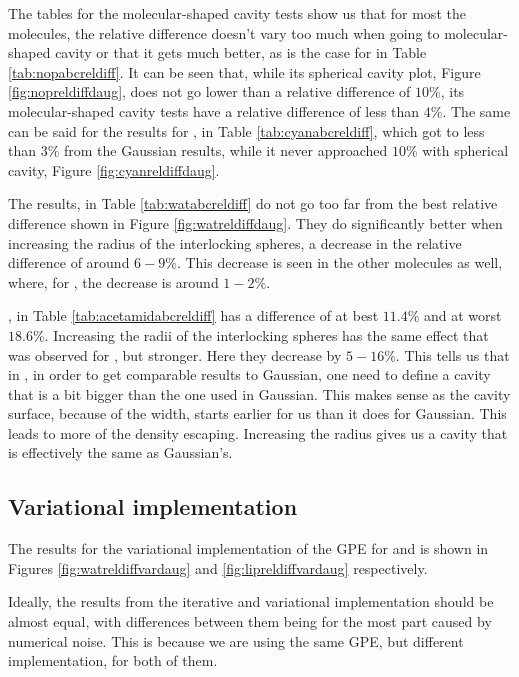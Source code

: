 \documentclass[../master_thesis.tex]{subfiles}
\begin{document}
The tables for the molecular-shaped cavity tests  show us that for most the molecules, the
relative difference doesn't vary too much when going to molecular-shaped cavity or that it gets
much better, as is the case for  in Table \ref{tab:nopabcreldiff}.
It can be seen that, while its spherical cavity plot, Figure \ref{fig:nopreldiffdaug}, does not go
lower than a relative difference of $10\%$, its molecular-shaped cavity tests have a relative difference
of less than $4\%$. The same can be said for the results for , in Table \ref{tab:cyanabcreldiff},
which got to less than $3\%$ from the Gaussian results, while it never approached $10\%$
with spherical cavity, Figure \ref{fig:cyanreldiffdaug}.

The  results, in Table \ref{tab:watabcreldiff} do not go too far from the best relative difference
shown in Figure \ref{fig:watreldiffdaug}. They do significantly better when increasing
the radius of the interlocking spheres, a decrease in the relative difference of
around $6-9\%$. This decrease is seen in the other molecules as well, where,
for , the decrease is around $1-2\%$.

, in Table \ref{tab:acetamidabcreldiff} has a difference of at
best $11.4\%$ and at worst $18.6\%$. Increasing the radii of the interlocking spheres
has the same effect that was observed for , but stronger. Here they decrease by
$ 5-16\%$.  This tells us that in \mrchem, in order to get comparable results to
Gaussian, one need to define a cavity that is a bit bigger than the one used in Gaussian.
This makes sense as the cavity surface, because of the width, starts earlier for us
than it does for Gaussian. This leads to more of the density escaping. Increasing the
radius gives us a cavity that is effectively the same as Gaussian's.

\subsection{Variational implementation}
The results for the variational implementation of the \ac{GPE} for  and 
is shown in Figures \ref{fig:watreldiffvardaug} and \ref{fig:lipreldiffvardaug}
respectively.

Ideally, the results from the iterative and variational implementation should be
almost equal, with differences between them being for the most part caused by numerical
noise. This is because we are using the same \ac{GPE}, but different implementation,
for both of them.
\end{document}
